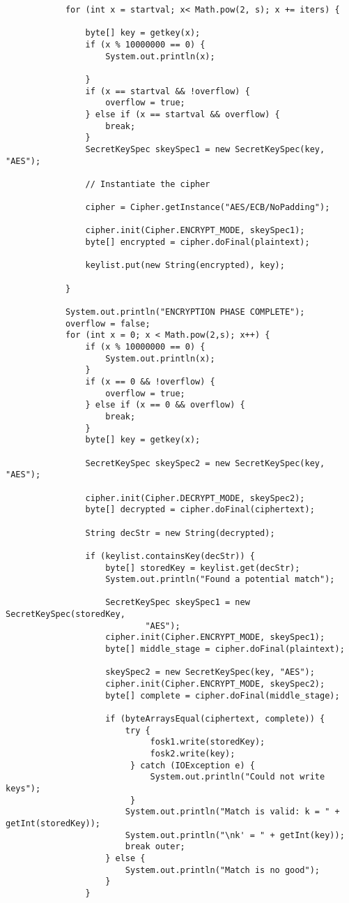 \documentclass[11pt]{article}
\begin{document}
\begin{verbatim}
			for (int x = startval; x< Math.pow(2, s); x += iters) {

				byte[] key = getkey(x);
				if (x % 10000000 == 0) {
					System.out.println(x);
					
				}
				if (x == startval && !overflow) {
					overflow = true;
				} else if (x == startval && overflow) {
					break;
				}
				SecretKeySpec skeySpec1 = new SecretKeySpec(key, "AES");

				// Instantiate the cipher

				cipher = Cipher.getInstance("AES/ECB/NoPadding");

				cipher.init(Cipher.ENCRYPT_MODE, skeySpec1);
				byte[] encrypted = cipher.doFinal(plaintext);

				keylist.put(new String(encrypted), key);

			}

			System.out.println("ENCRYPTION PHASE COMPLETE");
			overflow = false;
			for (int x = 0; x < Math.pow(2,s); x++) {
				if (x % 10000000 == 0) {
					System.out.println(x);
				}
				if (x == 0 && !overflow) {
					overflow = true;
				} else if (x == 0 && overflow) {
					break;
				}
				byte[] key = getkey(x);
				
				SecretKeySpec skeySpec2 = new SecretKeySpec(key, "AES");

				cipher.init(Cipher.DECRYPT_MODE, skeySpec2);
				byte[] decrypted = cipher.doFinal(ciphertext);

				String decStr = new String(decrypted);

				if (keylist.containsKey(decStr)) {
					byte[] storedKey = keylist.get(decStr);
					System.out.println("Found a potential match");

					SecretKeySpec skeySpec1 = new SecretKeySpec(storedKey,
							"AES");
					cipher.init(Cipher.ENCRYPT_MODE, skeySpec1);
					byte[] middle_stage = cipher.doFinal(plaintext);

					skeySpec2 = new SecretKeySpec(key, "AES");
					cipher.init(Cipher.ENCRYPT_MODE, skeySpec2);
					byte[] complete = cipher.doFinal(middle_stage);

					if (byteArraysEqual(ciphertext, complete)) {
						try {
			                 fosk1.write(storedKey);
			                 fosk2.write(key);
			             } catch (IOException e) {
			                 System.out.println("Could not write keys");
			             }
						System.out.println("Match is valid: k = " + getInt(storedKey));
						System.out.println("\nk' = " + getInt(key));
						break outer;
					} else {
						System.out.println("Match is no good");
					}
				}


\end{verbatim}
\end{document}
